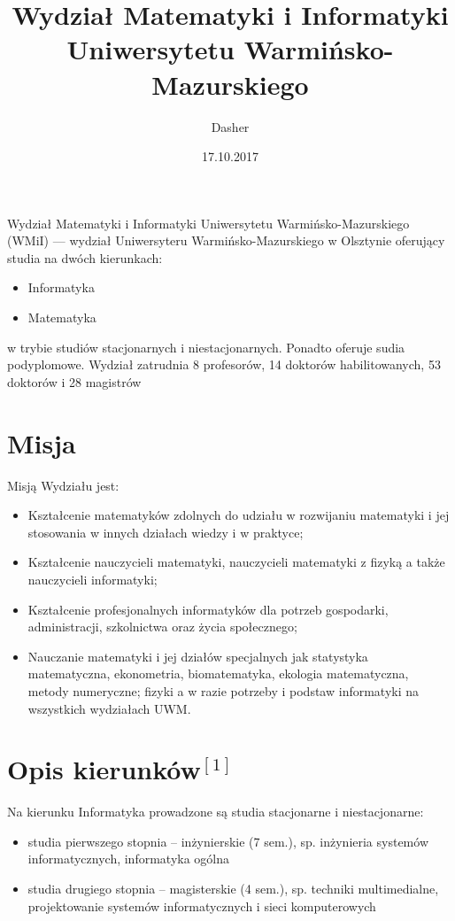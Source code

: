 \documentclass[a4paper,12pt]{article}
\title{Wydział Matematyki i Informatyki Uniwersytetu Warmińsko-Mazurskiego}
\author{Dasher}
\date{17.10.2017}
\begin{document}
\maketitle
Wydział Matematyki i Informatyki Uniwersytetu Warmińsko-Mazurskiego (WMiI) --- wydział Uniwersyteru Warmińsko-Mazurskiego w Olsztynie oferujący studia na dwóch kierunkach:

\begin{itemize}
\item Informatyka
\item Matematyka
\end{itemize}
{}w trybie studiów stacjonarnych i niestacjonarnych. Ponadto oferuje sudia podyplomowe.
\newline
\newline Wydział zatrudnia 8 profesorów, 14 doktorów habilitowanych, 53 doktorów i 28 magistrów

\tableofcontents

\section{Misja}
Misją Wydziału jest:

\begin{itemize}
\item Kształcenie matematyków zdolnych do udziału w rozwijaniu matematyki i jej stosowania w innych działach wiedzy i w praktyce;
\item Kształcenie nauczycieli matematyki, nauczycieli matematyki z fizyką a także nauczycieli informatyki;
\item Kształcenie profesjonalnych informatyków dla potrzeb gospodarki, administracji, szkolnictwa oraz życia
społecznego;
\item Nauczanie matematyki i jej działów specjalnych jak statystyka matematyczna, ekonometria,
biomatematyka, ekologia matematyczna, metody numeryczne; fizyki a w razie potrzeby i podstaw
informatyki na wszystkich wydziałach UWM.
\end{itemize}

\section{Opis kierunków$^{[1]}$}
Na kierunku Informatyka prowadzone są studia stacjonarne i niestacjonarne:

\begin{itemize}
\item studia pierwszego stopnia – inżynierskie (7 sem.), sp. inżynieria systemów informatycznych, informatyka ogólna
\item studia drugiego stopnia – magisterskie (4 sem.), sp. techniki multimedialne, projektowanie systemów informatycznych i sieci komputerowych
\end{itemize}
\end{document}
